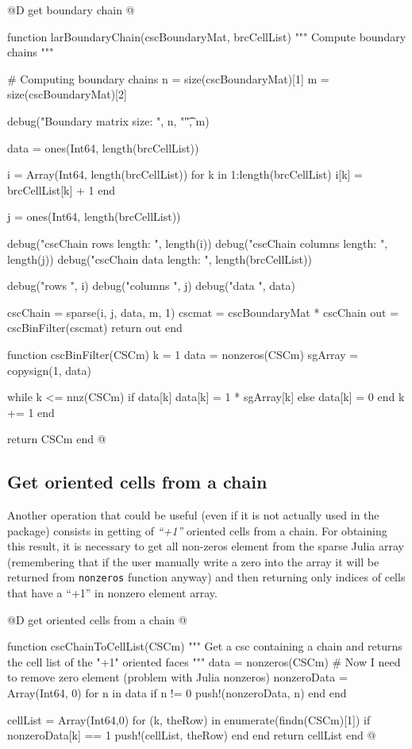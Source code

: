 \documentclass[11pt,oneside]{article}	%
\begin{document}
@D get boundary chain
@{function larBoundaryChain(cscBoundaryMat, brcCellList)
  """
  Compute boundary chains
  """

  # Computing boundary chains
  n = size(cscBoundaryMat)[1]
  m = size(cscBoundaryMat)[2]

  debug("Boundary matrix size: ", n, "\t", m)

  data = ones(Int64, length(brcCellList))

  i = Array(Int64, length(brcCellList))
  for k in 1:length(brcCellList)
    i[k] = brcCellList[k] + 1
  end

  j = ones(Int64, length(brcCellList))

  debug("cscChain rows length: ", length(i))
  debug("cscChain columns length: ", length(j))
  debug("cscChain data length: ", length(brcCellList))

  debug("rows ", i)
  debug("columns ", j)
  debug("data ", data)

  cscChain = sparse(i, j, data, m, 1)
  cscmat = cscBoundaryMat * cscChain
  out = cscBinFilter(cscmat)
  return out
end

function cscBinFilter(CSCm)
  k = 1
  data = nonzeros(CSCm)
  sgArray = copysign(1, data)

  while k <= nnz(CSCm)
    if data[k] %
      data[k] = 1 * sgArray[k]
    else
      data[k] = 0
    end
    k += 1
  end

  return CSCm
end @}

\subsection{Get oriented cells from a chain}\label{sec:getCellsFromChain}

Another operation that could be useful (even if it is not actually used in the package) consists in getting of \textit{``+1''} oriented cells from a chain. For obtaining this result, it is necessary to get all non-zeros element from the sparse Julia array (remembering that if the user manually write a zero into the array it will be returned from \texttt{nonzeros} function anyway) and then returning only indices of cells that have a ``+1'' in nonzero element array.

@D get oriented cells from a chain
@{function cscChainToCellList(CSCm)
  """
  Get a csc containing a chain and returns
  the cell list of the "+1" oriented faces
  """
  data = nonzeros(CSCm)
  # Now I need to remove zero element (problem with Julia nonzeros)
  nonzeroData = Array(Int64, 0)
  for n in data
    if n != 0
      push!(nonzeroData, n)
    end
  end

  cellList = Array(Int64,0)
  for (k, theRow) in enumerate(findn(CSCm)[1])
    if nonzeroData[k] == 1
      push!(cellList, theRow)
    end
  end
  return cellList
end @}
\end{document}
